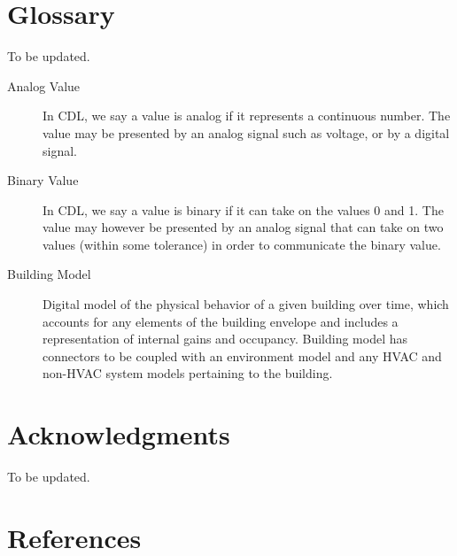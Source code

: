 \documentclass[letterpaper,10pt, openany,english]{sphinxmanual}
\begin{document}
\chapter{Glossary}
\label{\detokenize{glossary:glossary}}\label{\detokenize{glossary:sec-glossary}}\label{\detokenize{glossary::doc}}
To be updated.
\begin{description}
\item[{Analog Value\label{\detokenize{glossary:term-analog-value}}}] \leavevmode
In CDL, we say a value is analog if it represents a continuous
number. The value may be presented by an analog signal such as
voltage, or by a digital signal.

\item[{Binary Value\label{\detokenize{glossary:term-binary-value}}}] \leavevmode
In CDL, we say a value is binary if it can take on the values
0 and 1. The value may however be presented by an analog signal
that can take on two values (within some tolerance) in order
to communicate the binary value.

\item[{Building Model\label{\detokenize{glossary:term-building-model}}}] \leavevmode
Digital model of the physical behavior of a given building over time,
which accounts for any elements of the building envelope and includes a
representation of internal gains and occupancy. Building model has connectors
to be coupled with an environment model and any HVAC and non-HVAC system models
pertaining to the building.

\end{description}


\chapter{Acknowledgments}
\label{\detokenize{acknowledgments:acknowledgments}}\label{\detokenize{acknowledgments::doc}}
To be updated.


\chapter{References}
\label{\detokenize{bibliography:references}}\label{\detokenize{bibliography:id1}}\label{\detokenize{bibliography::doc}}
\end{document}
